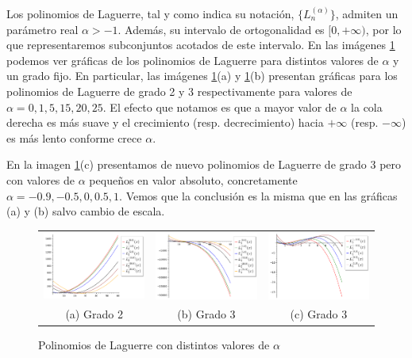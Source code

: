 Los polinomios de Laguerre, tal y como indica su notación, $\{L^{(\alpha)}_n\}$, admiten un parámetro real $\alpha > -1$. Además, su intervalo de ortogonalidad es $[0,+\infty)$, por lo que representaremos subconjuntos acotados de este intervalo. En las imágenes \ref{img:graficas-Laguerre-alpha} podemos ver gráficas de los polinomios de Laguerre para distintos valores de $\alpha$ y un grado fijo. En particular, las imágenes \ref{img:graficas-Laguerre-alpha}(a) y \ref{img:graficas-Laguerre-alpha}(b) presentan gráficas para los polinomios de Laguerre de grado 2 y 3 respectivamente para valores de $\alpha=0,1,5,15,20,25$. El efecto que notamos es que a mayor valor de $\alpha$ la cola derecha es más suave y el crecimiento (resp. decrecimiento) hacia $+\infty$ (resp. $-\infty$) es más lento conforme crece $\alpha$. 

En la imagen  \ref{img:graficas-Laguerre-alpha}(c) presentamos de nuevo polinomios de Laguerre de grado 3 pero con valores de $\alpha$ pequeños en valor absoluto, concretamente $\alpha = -0.9, -0.5, 0, 0.5, 1$. Vemos que la conclusión es la misma que en las gráficas (a) y (b) salvo cambio de escala.

\begin{figure}[h]
    \centering
    \begin{tabular}{ccc}
        \includegraphics[width=5cm]{img/C2/Laguerre1.png} & 
        \includegraphics[width=5cm]{img/C2/Laguerre2.png} &
        \includegraphics[width=5cm]{img/C2/Laguerre3.png} \\
        (a) Grado 2 & (b) Grado 3 & (c) Grado 3 
    \end{tabular}
    \caption{Polinomios de Laguerre con distintos valores de $\alpha$}
    \label{img:graficas-Laguerre-alpha}
\end{figure}

